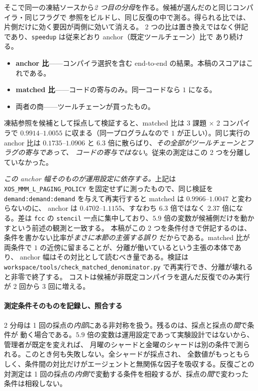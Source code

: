\documentclass[conference,letterpaper]{IEEEtran}
\begin{document}
そこで同一の凍結ソースから\emph{2 つ目の分母}を作る。候補が選んだのと同じコンパイラ・同じフラグで
参照をビルドし、同じ反復の中で測る。得られる比では、片側だけに効く要因が両側に効いて消える。
2 つの比は置き換えではなく併記であり、\texttt{speedup} は従来どおり anchor（既定ツールチェーン）比で
あり続ける。

\begin{itemize}
\item \textbf{anchor 比}——コンパイラ選択を含む end-to-end の結果。本稿のスコアはこれである。
\item \textbf{matched 比}——コードの寄与のみ。同一コードなら $1$ になる。
\item 両者の商——ツールチェーンが買ったもの。
\end{itemize}

凍結参照を候補として採点して検証すると、matched 比は 3 課題 $\times$ 2 コンパイラで
$0.9914$--$1.0055$ に収まる（同一プログラムなので $1$ が正しい）。同じ実行の anchor 比は
$0.1735$--$1.0906$ と $6.3$ 倍に散らばり、\emph{その全部がツールチェーンとフラグの寄与であって、
コードの寄与ではない}。従来の測定はこの 2 つを分離していなかった。

\emph{この anchor 幅そのものが運用設定に依存する。}上記は
\texttt{XOS\_MMM\_L\_PAGING\_POLICY} を固定せずに測ったもので、同じ検証を
\texttt{demand:demand:demand} を与えて再実行すると matched は $0.9966$--$1.0047$ と変わらないのに、
anchor は $0.4702$--$1.1155$、すなわち $6.3$ 倍ではなく $2.37$ 倍になる。差は \texttt{fcc} の
\texttt{stencil} 一点に集中しており、$5.9$ 倍の変数が候補側だけを動かすという前述の観測と一致する。
本稿がこの 2 つを条件付きで併記するのは、条件を書かない比率が\emph{まさに本節の主張する誤り}
だからである。matched 比が両条件で $1$ の近傍に留まることが、分離が働いているという主張の本体であり、
anchor 幅はその対比として読むべき量である。検証は
\texttt{workspace/tools/check\_matched\_denominator.py} で再実行でき、分離が壊れると非零で終了する。
コストは候補が非既定コンパイラを選んだ反復でのみ実行が 2 回から 3 回に増える。

\paragraph*{測定条件そのものを記録し、照合する}
2 分母は 1 回の採点の\emph{内部}にある非対称を扱う。残るのは、採点と採点の\emph{間}で条件が
動く場合である。$5.9$ 倍の変数は運用設定であって実験設計ではないから、管理者が既定を変えれば、
月曜のシャードと金曜のシャードは別の条件で測られる。このとき何も失敗しない。全シャードが採点され、
全数値がもっともらしく、条件間の対比だけがエージェントと無関係な因子を吸収する。反復ごとの対測定は
1 回の採点の\emph{内側}で変動する条件を相殺するが、採点の\emph{間}で変わった条件は相殺しない。
\end{document}
